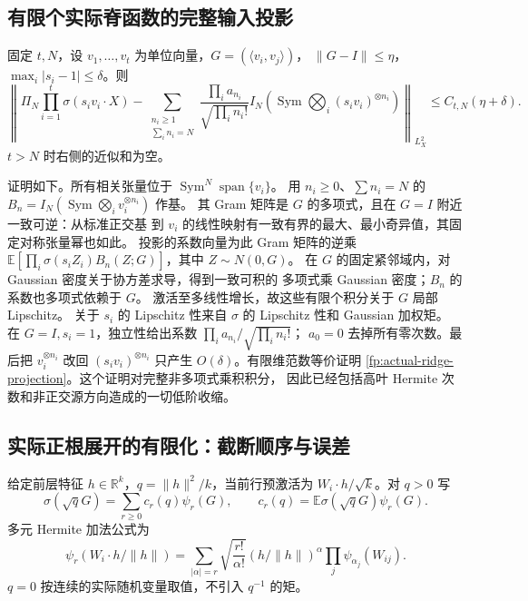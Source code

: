 \documentclass[a4paper]{tufte-handout}
\begin{document}
\begin{fullwidth}
\subsection{有限个实际脊函数的完整输入投影}
\label{fp:actual-finite-support}
固定 $t,N$，设 $v_1,\ldots,v_t$ 为单位向量，$G=(\langle v_i,v_j\rangle)$，
$\|G-I\|\leq\eta$，$\max_i|s_i-1|\leq\delta$。则
\begin{equation}\label{fp:actual-ridge-projection}
 \left\|\Pi_N\prod_{i=1}^t\sigma(s_iv_i\cdot X)
 -\sum_{\substack{n_i\geq1\\\sum_i n_i=N}}
 \frac{\prod_i a_{n_i}}{\sqrt{\prod_i n_i!}}
 I_N\!\left(\operatorname{Sym}\bigotimes_i(s_iv_i)^{\otimes n_i}\right)
 \right\|_{L^2_X}\leq C_{t,N}(\eta+\delta).
\end{equation}
$t>N$ 时右侧的近似和为空。

证明如下。所有相关张量位于 $\operatorname{Sym}^N\operatorname{span}\{v_i\}$。
用 $n_i\geq0$、$\sum n_i=N$ 的
$B_n=I_N(\operatorname{Sym}\bigotimes_i v_i^{\otimes n_i})$ 作基。
其 Gram 矩阵是 $G$ 的多项式，且在 $G=I$ 附近一致可逆：从标准正交基
到 $v_i$ 的线性映射有一致有界的最大、最小奇异值，其固定对称张量幂也如此。
投影的系数向量为此 Gram 矩阵的逆乘
$\mathbb E[\prod_i\sigma(s_iZ_i) B_n(Z;G)]$，其中 $Z\sim N(0,G)$。
在 $G$ 的固定紧邻域内，对 Gaussian 密度关于协方差求导，得到一致可积的
多项式乘 Gaussian 密度；$B_n$ 的系数也多项式依赖于 $G$。
激活至多线性增长，故这些有限个积分关于 $G$ 局部 Lipschitz。
关于 $s_i$ 的 Lipschitz 性来自 $\sigma$ 的 Lipschitz 性和 Gaussian 加权矩。
在 $G=I,s_i=1$，独立性给出系数 $\prod_i a_{n_i}/\sqrt{\prod_i n_i!}$；
$a_0=0$ 去掉所有零次数。最后把 $v_i^{\otimes n_i}$ 改回
$(s_iv_i)^{\otimes n_i}$ 只产生 $O(\delta)$。有限维范数等价证明
\eqref{fp:actual-ridge-projection}。这个证明对完整非多项式乘积积分，
因此已经包括高叶 Hermite 次数和非正交源方向造成的一切低阶收缩。

\subsection{实际正根展开的有限化：截断顺序与误差}
\label{fp:actual-positive}
给定前层特征 $h\in\mathbb R^k$，$q=\|h\|^2/k$，当前行预激活为
$W_i\cdot h/\sqrt k$。对 $q>0$ 写
\[
 \sigma(\sqrt q G)=\sum_{r\geq0}c_r(q)\psi_r(G),\qquad
 c_r(q)=\mathbb E\sigma(\sqrt qG)\psi_r(G).
\]
多元 Hermite 加法公式为
\begin{equation}\label{fp:actual-multivariate}
 \psi_r(W_i\cdot h/\|h\|)=
 \sum_{|\alpha|=r}\sqrt{\frac{r!}{\alpha!}}
 (h/\|h\|)^\alpha\prod_j\psi_{\alpha_j}(W_{ij}).
\end{equation}
$q=0$ 按连续的实际随机变量取值，不引入 $q^{-1}$ 的矩。


\end{fullwidth}
\end{document}
